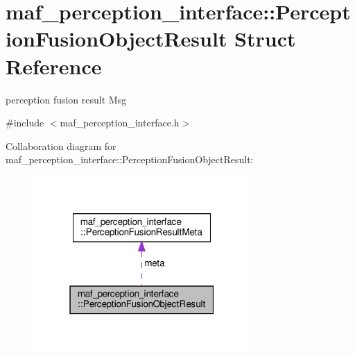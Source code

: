 \hypertarget{structmaf__perception__interface_1_1PerceptionFusionObjectResult}{}\section{maf\+\_\+perception\+\_\+interface\+:\+:Perception\+Fusion\+Object\+Result Struct Reference}
\label{structmaf__perception__interface_1_1PerceptionFusionObjectResult}


perception fusion result Msg  




{\ttfamily \#include $<$maf\+\_\+perception\+\_\+interface.\+h$>$}



Collaboration diagram for maf\+\_\+perception\+\_\+interface\+:\+:Perception\+Fusion\+Object\+Result\+:\nopagebreak
\begin{figure}[H]
\begin{center}
\leavevmode
\includegraphics[width=235pt]{structmaf__perception__interface_1_1PerceptionFusionObjectResult__coll__graph}
\end{center}
\end{figure}
